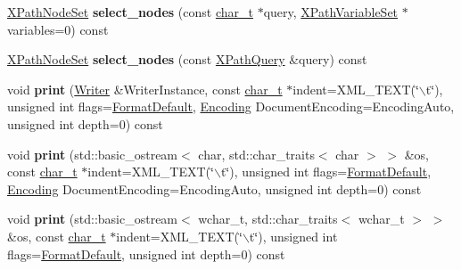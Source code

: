 \begin{DoxyCompactItemize}
\item 
\hypertarget{classphys_1_1xml_1_1Node_ad8bc358815511c63677a60149fe9a6dd}{
\hyperlink{classphys_1_1xml_1_1XPathNodeSet}{XPathNodeSet} {\bfseries select\_\-nodes} (const \hyperlink{namespacephys_1_1xml_afc87705cd1c2917d87b879715a2d8f6e}{char\_\-t} $\ast$query, \hyperlink{classphys_1_1xml_1_1XPathVariableSet}{XPathVariableSet} $\ast$variables=0) const }
\label{d7/d0a/classphys_1_1xml_1_1Node_ad8bc358815511c63677a60149fe9a6dd}

\item 
\hypertarget{classphys_1_1xml_1_1Node_ae1e232d5d010ca9272edd7bbe3154b44}{
\hyperlink{classphys_1_1xml_1_1XPathNodeSet}{XPathNodeSet} {\bfseries select\_\-nodes} (const \hyperlink{classphys_1_1xml_1_1XPathQuery}{XPathQuery} \&query) const }
\label{d7/d0a/classphys_1_1xml_1_1Node_ae1e232d5d010ca9272edd7bbe3154b44}

\item 
\hypertarget{classphys_1_1xml_1_1Node_a526817671e39653b0dca70c2ba8daa55}{
void {\bfseries print} (\hyperlink{classphys_1_1xml_1_1Writer}{Writer} \&WriterInstance, const \hyperlink{namespacephys_1_1xml_afc87705cd1c2917d87b879715a2d8f6e}{char\_\-t} $\ast$indent=XML\_\-TEXT(\char`\"{}$\backslash$t\char`\"{}), unsigned int flags=\hyperlink{namespacephys_1_1xml_a08bf6aab51f79929d9097706a5e64408}{FormatDefault}, \hyperlink{namespacephys_1_1xml_a420f5de782438f88160321385bea2015}{Encoding} DocumentEncoding=EncodingAuto, unsigned int depth=0) const }
\label{d7/d0a/classphys_1_1xml_1_1Node_a526817671e39653b0dca70c2ba8daa55}

\item 
\hypertarget{classphys_1_1xml_1_1Node_a99158a08970f0497a3925dddf8227b87}{
void {\bfseries print} (std::basic\_\-ostream$<$ char, std::char\_\-traits$<$ char $>$ $>$ \&os, const \hyperlink{namespacephys_1_1xml_afc87705cd1c2917d87b879715a2d8f6e}{char\_\-t} $\ast$indent=XML\_\-TEXT(\char`\"{}$\backslash$t\char`\"{}), unsigned int flags=\hyperlink{namespacephys_1_1xml_a08bf6aab51f79929d9097706a5e64408}{FormatDefault}, \hyperlink{namespacephys_1_1xml_a420f5de782438f88160321385bea2015}{Encoding} DocumentEncoding=EncodingAuto, unsigned int depth=0) const }
\label{d7/d0a/classphys_1_1xml_1_1Node_a99158a08970f0497a3925dddf8227b87}

\item 
\hypertarget{classphys_1_1xml_1_1Node_a27b7869e5208547e06b6164bbc68ca0e}{
void {\bfseries print} (std::basic\_\-ostream$<$ wchar\_\-t, std::char\_\-traits$<$ wchar\_\-t $>$ $>$ \&os, const \hyperlink{namespacephys_1_1xml_afc87705cd1c2917d87b879715a2d8f6e}{char\_\-t} $\ast$indent=XML\_\-TEXT(\char`\"{}$\backslash$t\char`\"{}), unsigned int flags=\hyperlink{namespacephys_1_1xml_a08bf6aab51f79929d9097706a5e64408}{FormatDefault}, unsigned int depth=0) const }
\label{d7/d0a/classphys_1_1xml_1_1Node_a27b7869e5208547e06b6164bbc68ca0e}


\end{DoxyCompactItemize}
